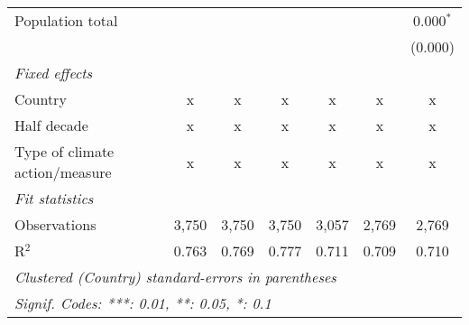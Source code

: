 \begin{tabular}{lcccccc}
   Population total                                                   &              &               &               &                &                & 0.000$^{*}$\\   
                                                                      &              &               &               &                &                & (0.000)\\   
   \emph{Fixed effects}\\
   Country                                                            & x            & x             & x             & x              & x              & x\\  
   Half decade                                                        & x            & x             & x             & x              & x              & x\\  
   Type of climate action/measure                                     & x            & x             & x             & x              & x              & x\\  
   \midrule \emph{Fit statistics}\\
   Observations                                                       & 3,750        & 3,750         & 3,750         & 3,057          & 2,769          & 2,769\\  
   R$^2$                                                              & 0.763        & 0.769         & 0.777         & 0.711          & 0.709          & 0.710\\  
   \midrule
   \multicolumn{7}{l}{\emph{Clustered (Country) standard-errors in parentheses}}\\
   \multicolumn{7}{l}{\emph{Signif. Codes: ***: 0.01, **: 0.05, *: 0.1}}\\
\end{tabular}
\par\endgroup


